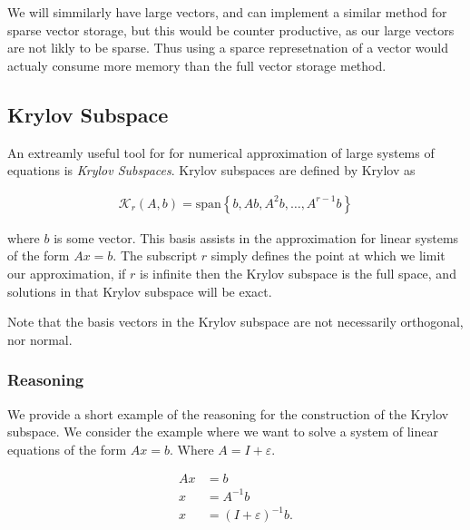 \documentclass[../fem.tex]{subfiles}
\begin{document}
We will simmilarly have large vectors, and can implement a similar method for
sparse vector storage, but this would be counter productive, as our large
vectors are not likly to be sparse. Thus using a sparce represetnation of a
vector would actualy consume more memory than the full vector storage method.

\subsection{Krylov Subspace}%
\label{sub:krylov_subspace}

An extreamly useful tool for for numerical approximation of large systems of
equations is \textit{Krylov Subspaces}. Krylov subspaces are defined by
Krylov\cite{KRYLOV} as


\begin{align*}
  \mathcal{K}_r\left(A,b\right)=\text{span}\left\{b,Ab,A^2b,\ldots,A^{r-1}b\right\}
\end{align*}

where $b$ is some vector. This basis assists in the approximation for linear
systems of the form $Ax=b$. The subscript $r$ simply defines the point at which
we limit our approximation, if $r$ is infinite then the Krylov subspace is the
full space, and solutions in that Krylov subspace will be exact.

Note that the basis vectors in the Krylov subspace are not necessarily
orthogonal, nor normal.

\subsubsection{Reasoning}%
\label{ssub:reasoning}

We provide a short example of the reasoning for the construction of the Krylov
subspace. We consider the example where we want to solve a system of linear
equations of the form $Ax=b$. Where $A=I+\varepsilon$.

\begin{align*}
  Ax&=b\\
  x&=A^{-1}b\\
  x&=(I+\varepsilon)^{-1}b.
\end{align*}
\end{document}
